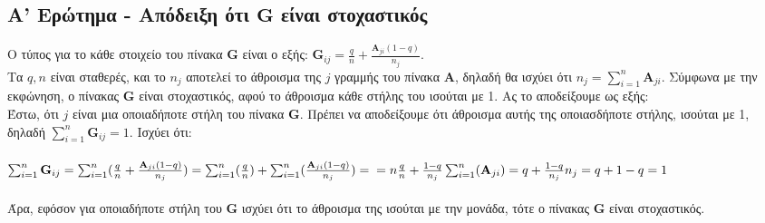 \documentclass[a4paper, 14pt]{article}   %
\begin{document}
\subsection*{Α' Ερώτημα - Απόδειξη ότι $\mathbf{G}$ είναι στοχαστικός}  %
Ο τύπος για το κάθε στοιχείο του πίνακα $\mathbf{G}$ είναι ο εξής: $\mathbf{G}_{ij} = \frac{q}{n} + \frac{\mathbf{A}_{ji}(1-q)}{n_j}$.\\ Τα $q,n$ είναι σταθερές, και το $n_j$ αποτελεί το άθροισμα της $j$ γραμμής του πίνακα $\mathbf{A}$, δηλαδή θα ισχύει ότι $n_j = \sum_{i=1}^{n}\mathbf{A}_{ji}$. Σύμφωνα με την εκφώνηση, ο πίνακας $\mathbf{G}$ είναι στοχαστικός, αφού το άθροισμα κάθε στήλης του ισούται με 1. Ας το αποδείξουμε ως εξής:\\
Έστω, ότι $j$ είναι μια οποιαδήποτε στήλη του πίνακα $\mathbf{G}$. Πρέπει να αποδείξουμε ότι άθροισμα αυτής της οποιασδήποτε στήλης, ισούται με 1, δηλαδή $\sum_{i=1}^{n}\mathbf{G}_{ij} = 1$. Ισχύει ότι:\\\\$\sum_{i=1}^{n}\mathbf{G}_{ij} = \sum_{i=1}^{n}(\frac{q}{n} + \frac{\mathbf{A}_{ji}(1-q)}{n_j}) = \sum_{i=1}^{n}(\frac{q}{n}) + \sum_{i=1}^{n}(\frac{\mathbf{A}_{ji}(1-q)}{n_j}) =\\= n\frac{q}{n} + \frac{1-q}{n_j}\sum_{i=1}^{n}(\mathbf{A}_{ji}) = q + \frac{1-q}{n_j}n_j = q + 1 - q = 1$\\\\Άρα, εφόσον για οποιαδήποτε στήλη του $\mathbf{G}$ ισχύει ότι το άθροισμα της ισούται με την μονάδα, τότε ο πίνακας $\mathbf{G}$ είναι στοχαστικός.
\\\\
\end{document}
